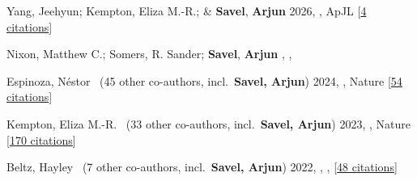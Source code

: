 \item[{\color{numcolor}\scriptsize6}] Yang, Jeehyun; Kempton, Eliza M.-R.; \& \textbf{Savel}, \textbf{Arjun} 2026, , ApJL [\href{https://ui.adsabs.harvard.edu/abs/2026ApJ..1003L..16Y}{4 citations}]



\item[{\color{numcolor}\scriptsize5}] Nixon, Matthew C.; Somers, R. Sander; \textbf{Savel}, \textbf{Arjun} , , 
















\item[{\color{numcolor}\scriptsize4}] Espinoza, N{\'e}stor \etal\ ({45} other co-authors, incl.\ \textbf{Savel, Arjun}) 2024, , Nature [\href{https://ui.adsabs.harvard.edu/abs/2024Natur.632.1017E}{54 citations}]







\item[{\color{numcolor}\scriptsize3}] Kempton, Eliza M.-R. \etal\ ({33} other co-authors, incl.\ \textbf{Savel, Arjun}) 2023, , Nature [\href{https://ui.adsabs.harvard.edu/abs/2023Natur.620...67K}{170 citations}]






\item[{\color{numcolor}\scriptsize2}] Beltz, Hayley \etal\ ({7} other co-authors, incl.\ \textbf{Savel, Arjun}) 2022, , \aj, [\href{https://ui.adsabs.harvard.edu/abs/2022AJ....164..140B}{48 citations}]


